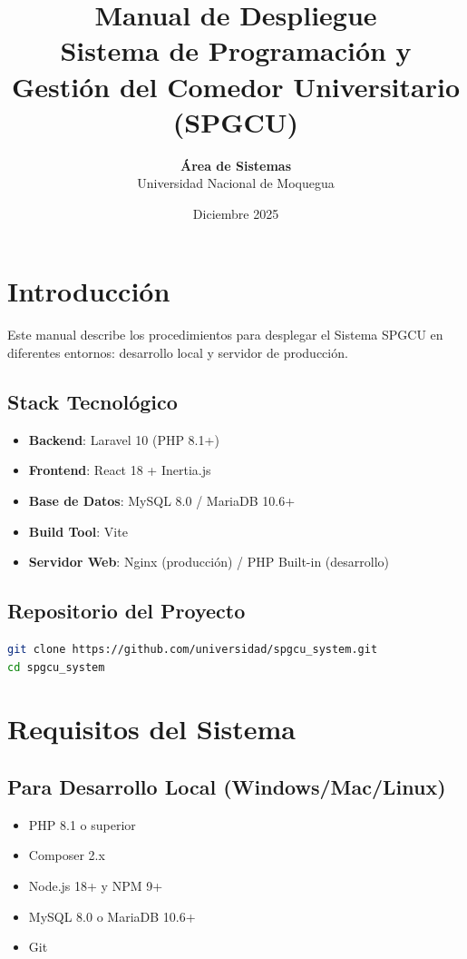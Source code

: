 \documentclass[12pt,a4paper]{article}
\title{
    \vspace{-2cm}
    \vspace{1cm}
    \vspace{1cm}
    \textbf{\Huge Manual de Despliegue} \\
    \vspace{0.5cm}
    \textbf{\Large Sistema de Programación y Gestión del Comedor Universitario} \\
    \vspace{0.3cm}
    \textbf{(SPGCU)}
}
\author{
    \textbf{Área de Sistemas} \\
    Universidad Nacional de Moquegua
}
\date{Diciembre 2025}
\begin{document}
\maketitle
\thispagestyle{empty}
\newpage

\tableofcontents
\newpage

\section{Introducción}

Este manual describe los procedimientos para desplegar el Sistema SPGCU en diferentes entornos: desarrollo local y servidor de producción.

\subsection{Stack Tecnológico}
\begin{itemize}
    \item \textbf{Backend}: Laravel 10 (PHP 8.1+)
    \item \textbf{Frontend}: React 18 + Inertia.js
    \item \textbf{Base de Datos}: MySQL 8.0 / MariaDB 10.6+
    \item \textbf{Build Tool}: Vite
    \item \textbf{Servidor Web}: Nginx (producción) / PHP Built-in (desarrollo)
\end{itemize}

\subsection{Repositorio del Proyecto}
\begin{lstlisting}[language=bash]
git clone https://github.com/universidad/spgcu_system.git
cd spgcu_system
\end{lstlisting}

\section{Requisitos del Sistema}

\subsection{Para Desarrollo Local (Windows/Mac/Linux)}
\begin{itemize}
    \item PHP 8.1 o superior
    \item Composer 2.x
    \item Node.js 18+ y NPM 9+
    \item MySQL 8.0 o MariaDB 10.6+
    \item Git
\end{itemize}
\end{document}
